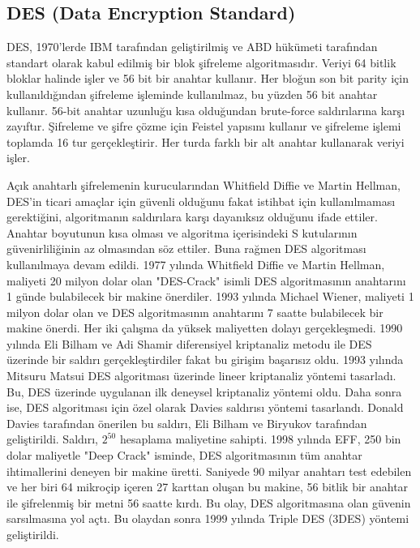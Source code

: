 \newpage

\subsection{DES (Data Encryption Standard)}

DES, 1970'lerde IBM tarafından geliştirilmiş ve ABD hükümeti tarafından standart olarak kabul edilmiş bir blok şifreleme algoritmasıdır. Veriyi 64 bitlik bloklar halinde işler ve 56 bit bir anahtar kullanır. Her bloğun son bit parity için kullanıldığından şifreleme işleminde kullanılmaz, bu yüzden 56 bit anahtar kullanır. 56-bit anahtar uzunluğu kısa olduğundan brute-force saldırılarına karşı zayıftır. Şifreleme ve şifre çözme için Feistel yapısını kullanır ve şifreleme işlemi toplamda 16 tur gerçekleştirir. Her turda farklı bir alt anahtar kullanarak veriyi işler. 

Açık anahtarlı şifrelemenin kurucularından Whitfield Diffie ve Martin Hellman, DES'in ticari amaçlar için güvenli olduğunu fakat istihbat için kullanılmaması gerektiğini, algoritmanın saldırılara karşı dayanıksız olduğunu ifade ettiler. Anahtar boyutunun kısa olması ve algoritma içerisindeki S kutularının güvenirliliğinin az olmasından söz ettiler. Buna rağmen DES algoritması kullanılmaya devam edildi. 1977 yılında Whitfield Diffie ve Martin Hellman, maliyeti 20 milyon dolar olan "DES-Crack" isimli DES algoritmasının anahtarını 1 günde bulabilecek bir makine önerdiler. 1993 yılında Michael Wiener, maliyeti 1 milyon dolar olan ve DES algoritmasının anahtarını 7 saatte bulabilecek bir makine önerdi. Her iki çalışma da yüksek maliyetten dolayı gerçekleşmedi. 1990 yılında Eli Bilham ve Adi Shamir diferensiyel kriptanaliz metodu ile DES üzerinde bir saldırı gerçekleştirdiler fakat bu girişim başarısız oldu. 1993 yılında Mitsuru Matsui DES algoritması üzerinde lineer kriptanaliz yöntemi tasarladı. Bu, DES üzerinde uygulanan ilk deneysel kriptanaliz yöntemi oldu. Daha sonra ise, DES algoritması için özel olarak Davies saldırısı yöntemi tasarlandı. Donald Davies tarafından önerilen bu saldırı, Eli Bilham ve Biryukov tarafından geliştirildi. Saldırı, $2^{50}$ hesaplama maliyetine sahipti. 1998 yılında EFF, 250 bin dolar maliyetle "Deep Crack" isminde, DES algoritmasının tüm anahtar ihtimallerini deneyen bir makine üretti. Saniyede 90 milyar anahtarı test edebilen ve her biri 64 mikroçip içeren 27 karttan oluşan bu makine, 56 bitlik bir anahtar ile şifrelenmiş bir metni 56 saatte kırdı. Bu olay, DES algoritmasına olan güvenin sarsılmasına yol açtı. Bu olaydan sonra 1999 yılında Triple DES (3DES) yöntemi geliştirildi.

